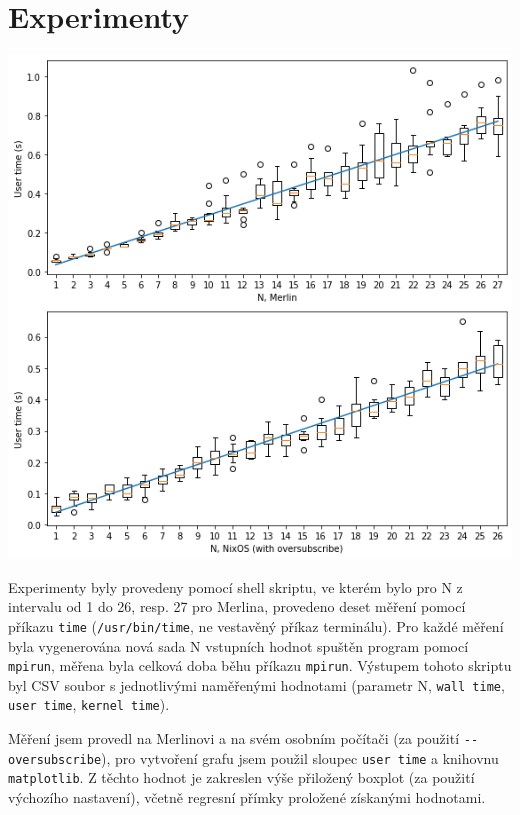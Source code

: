 \documentclass[11pt]{article}
\begin{document}
\section{Experimenty}
\label{sec:orge24a7ec}
\begin{center}
\includegraphics[width=.9\linewidth]{./.ob-jupyter/10773b02fdc9c6bbbe7ad2653184b22029124297.png}
\end{center}

Experimenty byly provedeny pomocí shell skriptu, ve kterém bylo pro N z
intervalu od 1 do 26, resp. 27 pro Merlina, provedeno deset měření pomocí
příkazu \texttt{time} (\texttt{/usr/bin/time}, ne vestavěný příkaz terminálu). Pro každé měření
byla vygenerována nová sada N vstupních hodnot spuštěn program pomocí \texttt{mpirun},
měřena byla celková doba běhu příkazu \texttt{mpirun}. Výstupem tohoto skriptu byl CSV
soubor s jednotlivými naměřenými hodnotami (parametr N, \texttt{wall time}, \texttt{user time},
\texttt{kernel time}).

Měření jsem provedl na Merlinovi a na svém osobním počítači (za použití
\texttt{-{}-oversubscribe}), pro vytvoření grafu jsem použil sloupec \texttt{user time} a knihovnu
\texttt{matplotlib}. Z těchto hodnot je zakreslen výše přiložený boxplot (za použití
výchozího nastavení), včetně regresní přímky proložené získanými hodnotami.
\end{document}
